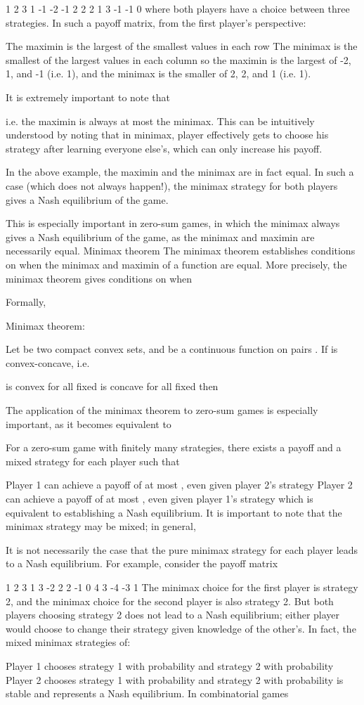 1	2	3
1	-1	-2	-1
2	2	2	1
3	-1	-1	0
where both players have a choice between three strategies. In such a payoff matrix, from the first player's perspective:

The maximin is the largest of the smallest values in each row
The minimax is the smallest of the largest values in each column
so the maximin is the largest of -2, 1, and -1 (i.e. 1), and the minimax is the smaller of 2, 2, and 1 (i.e. 1).

It is extremely important to note that

i.e. the maximin is always at most the minimax.
This can be intuitively understood by noting that in minimax, player  effectively gets to choose his strategy after learning everyone else's, which can only increase his payoff.

In the above example, the maximin and the minimax are in fact equal. In such a case (which does not always happen!), the minimax strategy for both players gives a Nash equilibrium of the game.

This is especially important in zero-sum games, in which the minimax always gives a Nash equilibrium of the game, as the minimax and maximin are necessarily equal.
Minimax theorem
The minimax theorem establishes conditions on when the minimax and maximin of a function are equal. More precisely, the minimax theorem gives conditions on when


Formally,

Minimax theorem:

Let  be two compact convex sets, and  be a continuous function on pairs . If  is convex-concave, i.e.

 is convex for all fixed 
 is concave for all fixed 
then

The application of the minimax theorem to zero-sum games is especially important, as it becomes equivalent to

For a zero-sum game with finitely many strategies, there exists a payoff  and a mixed strategy for each player such that

Player 1 can achieve a payoff of at most , even given player 2's strategy
Player 2 can achieve a payoff of at most , even given player 1's strategy
which is equivalent to establishing a Nash equilibrium.
It is important to note that the minimax strategy may be mixed; in general,

It is not necessarily the case that the pure minimax strategy for each player leads to a Nash equilibrium.
For example, consider the payoff matrix

1	2	3
1	3	-2	2
2	-1	0	4
3	-4	-3	1
The minimax choice for the first player is strategy 2, and the minimax choice for the second player is also strategy 2. But both players choosing strategy 2 does not lead to a Nash equilibrium; either player would choose to change their strategy given knowledge of the other's. In fact, the mixed minimax strategies of:

Player 1 chooses strategy 1 with probability  and strategy 2 with probability 
Player 2 chooses strategy 1 with probability  and strategy 2 with probability 
is stable and represents a Nash equilibrium.
In combinatorial games